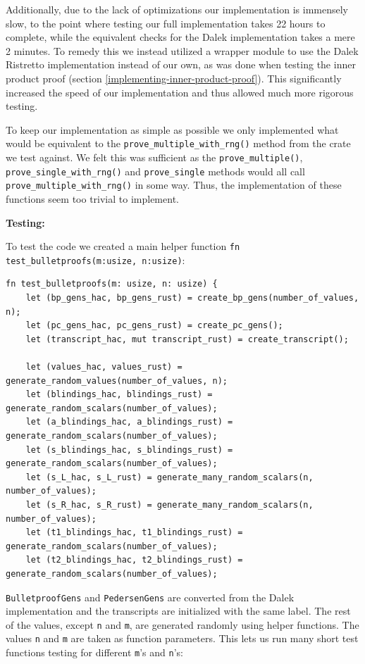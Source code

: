 \documentclass{article}
\begin{document}
Additionally, due to the lack of optimizations our implementation is
immensely slow, to the point where testing our full implementation
takes 22 hours to complete, while the equivalent checks for the Dalek
implementation takes a mere 2 minutes. To remedy this we instead
utilized a wrapper module to use the Dalek Ristretto implementation
instead of our own, as was done when testing the inner product proof
(section \ref{implementing-inner-product-proof}). This significantly
increased the speed of our implementation and thus allowed much more
rigorous testing.

To keep our implementation as simple as possible we only implemented
what would be equivalent to the \texttt{prove\_multiple\_with\_rng()}
method from the crate we test against. We felt this was sufficient as
the \texttt{prove\_multiple()}, \texttt{prove\_single\_with\_rng()}
and \texttt{prove\_single} methods would all call
\texttt{prove\_multiple\_with\_rng()} in some way. Thus, the 
implementation of these functions seem too trivial to implement.

\textbf{Testing:}

To test the code we created a main helper function \texttt{fn
test\_bulletproofs(m:usize, n:usize)}:

\begin{lstlisting}
fn test_bulletproofs(m: usize, n: usize) {
	let (bp_gens_hac, bp_gens_rust) = create_bp_gens(number_of_values, n);
	let (pc_gens_hac, pc_gens_rust) = create_pc_gens();
	let (transcript_hac, mut transcript_rust) = create_transcript();

	let (values_hac, values_rust) = generate_random_values(number_of_values, n);
	let (blindings_hac, blindings_rust) = generate_random_scalars(number_of_values);
	let (a_blindings_hac, a_blindings_rust) = generate_random_scalars(number_of_values);
	let (s_blindings_hac, s_blindings_rust) = generate_random_scalars(number_of_values);
	let (s_L_hac, s_L_rust) = generate_many_random_scalars(n, number_of_values);
	let (s_R_hac, s_R_rust) = generate_many_random_scalars(n, number_of_values);
	let (t1_blindings_hac, t1_blindings_rust) = generate_random_scalars(number_of_values);
	let (t2_blindings_hac, t2_blindings_rust) = generate_random_scalars(number_of_values);
\end{lstlisting}

\texttt{BulletproofGens} and \texttt{PedersenGens} are converted from
the Dalek implementation and the transcripts are initialized
with the same label. The rest of the values, except \texttt{n} and
\texttt{m}, are generated randomly using helper functions. The values
\texttt{n} and \texttt{m} are taken as function parameters. This lets
us run many short test functions testing for different \texttt{m}'s
and \texttt{n}'s:
\end{document}
